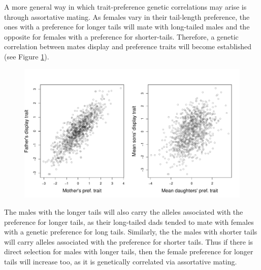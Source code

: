 A more general way in which trait-preference genetic correlations may
arise is through assortative mating. As females vary in their
tail-length preference, the ones with a preference for longer
tails will mate with long-tailed males and the opposite for females
with a preference for shorter-tails. Therefore, a
genetic correlation between mates display and preference traits will
become established (see Figure \ref{fig:assort_mating_2_trait}). 
\begin{figure}
\begin{center}
\includegraphics[width=\textwidth]{figures/Response_to_sel/Genetic_corr_assort_mating.pdf}
\end{center} \label{fig:assort_mating_2_trait}
\caption{}
\end{figure}
The males with the longer tails will also carry the alleles
associated with the preference for longer tails, as their long-tailed
dads tended to mate with females with a genetic preference for long
tails. Similarly, the the males with shorter tails will carry alleles associated with the preference for
shorter tails. Thus if there is direct selection for males with longer tails, then
the female preference for longer tails will increase too, as it is
genetically correlated via assortative mating. 

